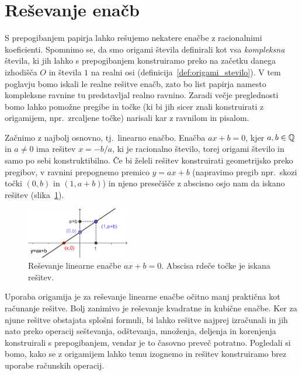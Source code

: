 \section{Reševanje enačb}
\label{pogl:enacbe}

S prepogibanjem papirja lahko rešujemo nekatere enačbe z racionalnimi koeficienti. Spomnimo se, da smo origami števila definirali kot vsa \emph{kompleksna} števila, ki jih lahko s prepogibanjem konstruiramo preko na začetku danega izhodišča $O$ in števila $1$ na realni osi (definicija~\ref{def:origami_stevilo}). V tem poglavju bomo iskali le realne rešitve enačb, zato bo list papirja namesto kompleksne ravnine tu predstavljal realno ravnino. Zaradi večje preglednosti bomo lahko pomožne pregibe in točke (ki bi jih sicer znali konstruirati z origamijem, npr.\ zrcaljene točke) narisali kar z ravnilom in pisalom.

Začnimo z najbolj osnovno, tj.\ linearno enačbo. Enačba $ax + b = 0$, kjer $a, b \in \mathbb Q$ in $a \neq 0$ ima rešitev $x = -b/a$, ki je racionalno število, torej origami število in samo po sebi konstruktibilno. Če bi želeli rešitev konstruirati geometrijsko preko pregibov, v ravnini prepognemo premico $y = ax + b$ (napravimo pregib npr.\ skozi točki $(0, b)$ in $(1, a+b)$) in njeno presečišče z abscisno osjo nam da iskano rešitev (slika~\ref{fig:lin_en}).

\begin{figure}[h]
    \centering
    \includegraphics[width=0.4\textwidth]{images/linearna_enacba.png}
    \caption[Reševanje linearne enačbe]{Reševanje linearne enačbe $ax+b=0$. Abscisa rdeče točke je iskana rešitev.}
    \label{fig:lin_en}
\end{figure}

Uporaba origamija je za reševanje linearne enačbe očitno manj praktična kot računanje rešitve. Bolj zanimivo je reševanje kvadratne in kubične enačbe. Ker za njune rešitve obstajata splošni formuli, bi lahko rešitve najprej izračunali in jih nato preko operacij seštevanja, odštevanja, množenja, deljenja in korenjenja konstruirali s prepogibanjem, vendar je to časovno preveč potratno. Pogledali si bomo, kako se z origamijem lahko temu izognemo in rešitev konstruiramo brez uporabe računskih operacij.

